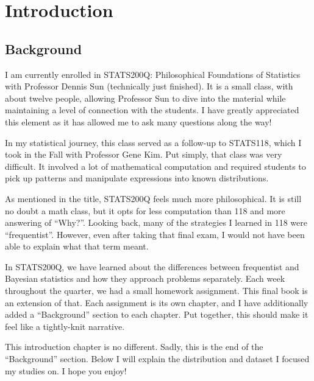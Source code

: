 \documentclass[
  letterpaper,
  DIV=11,
  numbers=noendperiod]{scrreprt}
\author{}
\date{}
\renewcommand*\contentsname{Table of contents}
\newcommand\contentsname{Table of contents}
\begin{document}
\renewcommand*\contentsname{Table of contents}
{
\setcounter{tocdepth}{2}
\tableofcontents
}


\chapter*{Introduction}\label{introduction}


\section*{Background}\label{background}


I am currently enrolled in STATS200Q: Philosophical Foundations of
Statistics with Professor Dennis Sun (technically just finished). It is
a small class, with about twelve people, allowing Professor Sun to dive
into the material while maintaining a level of connection with the
students. I have greatly appreciated this element as it has allowed me
to ask many questions along the way!

In my statistical journey, this class served as a follow-up to STATS118,
which I took in the Fall with Professor Gene Kim. Put simply, that class
was very difficult. It involved a lot of mathematical computation and
required students to pick up patterns and manipulate expressions into
known distributions.

As mentioned in the title, STATS200Q feels much more philosophical. It
is still no doubt a math class, but it opts for less computation than
118 and more answering of ``Why?''. Looking back, many of the strategies
I learned in 118 were ``frequentist''. However, even after taking that
final exam, I would not have been able to explain what that term meant.

In STATS200Q, we have learned about the differences between frequentist
and Bayesian statistics and how they approach problems separately. Each
week throughout the quarter, we had a small homework assignment. This
final book is an extension of that. Each assignment is its own chapter,
and I have additionally added a ``Background'' section to each chapter.
Put together, this should make it feel like a tightly-knit narrative.

This introduction chapter is no different. Sadly, this is the end of the
``Background'' section. Below I will explain the distribution and
dataset I focused my studies on. I hope you enjoy!
\end{document}

